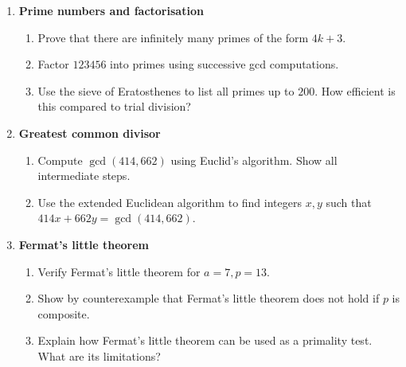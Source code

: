\begin{enumerate}

\item \textbf{Prime numbers and factorisation}
  \begin{enumerate}
    \item Prove that there are infinitely many primes of the form $4k+3$.
    \item Factor $123456$ into primes using successive gcd computations.
    \item Use the sieve of Eratosthenes to list all primes up to $200$. 
          How efficient is this compared to trial division?
  \end{enumerate}

\item \textbf{Greatest common divisor}
  \begin{enumerate}
    \item Compute $\gcd(414,662)$ using Euclid’s algorithm. Show all intermediate steps.
    \item Use the extended Euclidean algorithm to find integers $x,y$ such that 
          $414x + 662y = \gcd(414,662)$.
  \end{enumerate}

\item \textbf{Fermat’s little theorem}
  \begin{enumerate}
    \item Verify Fermat’s little theorem for $a=7, p=13$.
    \item Show by counterexample that Fermat’s little theorem does not hold if $p$ is composite.
    \item Explain how Fermat’s little theorem can be used as a primality test. 
          What are its limitations?
  \end{enumerate}


\end{enumerate}
